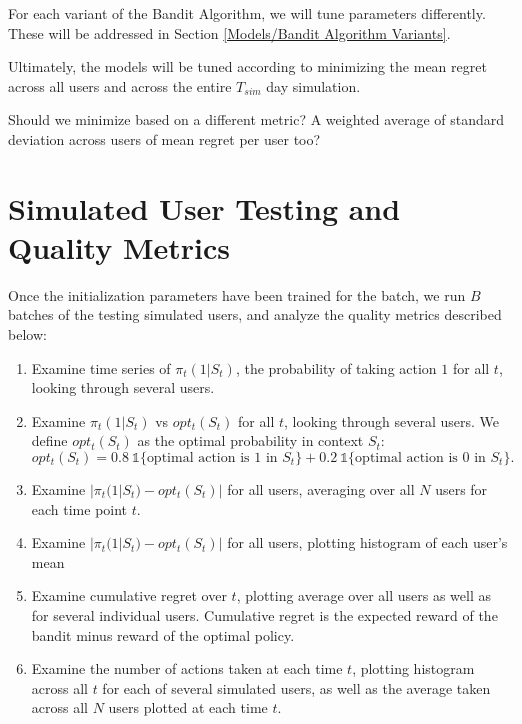 For each variant of the Bandit Algorithm, we will tune parameters differently.  These will be addressed in Section \ref{Models/Bandit Algorithm Variants}.

Ultimately, the models will be tuned according to minimizing the mean regret across all users and across the entire $T_{sim}$ day simulation.

{\color{red} Should we minimize based on a different metric?  A weighted average of standard deviation across users of mean regret per user too?}


\section{Simulated User Testing and Quality Metrics}

Once the initialization parameters have been trained for the batch, we run $B$ batches of the testing simulated users, and analyze the quality metrics described below:

\begin{enumerate}
	\item Examine time series of $\pi_t(1 | S_t)$, the probability of taking action $1$ for all $t$, looking through several users.
	\item Examine $\pi_t(1 | S_t)$ vs $opt_t(S_t)$ for all $t$, looking through several users.
	\subitem We define $opt_t(S_t)$ as the optimal probability in context $S_t$:
	\begin{equation}
	\label{opt equation}
		opt_t(S_t) = 0.8\ \mathbb{1}\{\text{optimal action is $1$ in $S_t$}\} + 0.2\ \mathbb{1}\{\text{optimal action is $0$ in $S_t$}\} .
	\end{equation}
	\item Examine $|\pi_t(1 | S_t) - opt_t(S_t)|$ for all users, averaging over all $N$ users for each time point $t$.
	\item Examine $|\pi_t(1 | S_t) - opt_t(S_t)|$ for all users, plotting histogram of each user's mean
	\item Examine cumulative regret over $t$, plotting average over all users as well as for several individual users. 
	\subitem Cumulative regret is the expected reward of the bandit minus reward of the optimal policy.
	\item Examine the number of actions taken at each time $t$, plotting histogram across all $t$ for each of several simulated users, as well as the average taken across all $N$ users plotted at each time $t$.
\end{enumerate}